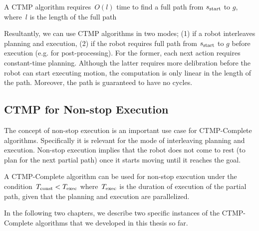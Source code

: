 \documentclass[a4paper]{report}
\begin{document}
\vspace{2mm}
\begin{property}
\label{ctmp:prop2}
A CTMP algorithm requires~$O(l)$ time to find a full path from $s_{\text{start}}$ to $g$, where~$l$ is the length of the full path
\end{property}

Resultantly, we can use CTMP algorithms in two modes; (1) if a robot interleaves planning and execution, (2) if the robot requires full path from $s_{\text{start}}$ to $g$ before execution (e.g. for post-processing). For the former, each next action requires constant-time planning. Although the latter requires more delibration before the robot can start executing motion, the computation is only linear in the length of the path. Moreover, the path is guaranteed to have no cycles.


\subsection{CTMP for Non-stop Execution}
The concept of non-stop execution is an important use case for CTMP-Complete algorithms. Specifically it is relevant for the mode of interleaving planning and execution. Non-stop execution implies that the robot does not come to rest (to plan for the next partial path) once it starts moving until it reaches the goal.

\vspace{2mm}
\begin{definition}
A CTMP-Complete algorithm can be used for non-stop execution under the condition~$T_{\textrm{const}} < T_{\textrm{exec}}$ where~$T_{\textrm{exec}}$ is the duration of execution of the partial path, given that the planning and execution are parallelized. 
\end{definition}
%
In the following two chapters, we describe two specific instances of the CTMP-Complete algorithms that we developed in this thesis so far.
\end{document}

